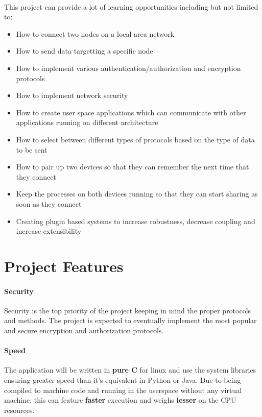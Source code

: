 \documentclass[12pt, letterpaper, titlepage]{article}
\begin{document}
    \paragraph{}
    This project can provide a lot of learning opportunities including but not
    limited to:
    \begin{itemize}
        \item{How to connect two nodes on a local area network}
        \item{How to send data targetting a specific node}
        \item{How to implement various authentication/authorization and
            encryption protocols}
        \item{How to implement network security}
        \item{How to create user space applications which can communicate with
            other applications running on different architecture}
        \item{How to select between different types of protocols based on the
            type of data to be sent}
        \item{How to pair up two devices so that they can remember the next
            time that they connect}
        \item{Keep the processes on both devices running so that they can start
            sharing as soon as they connect}
        \item{Creating plugin based systems to increase robustness, decrease
            coupling and increase extensibility}
    \end{itemize}


\newpage
\section{Project Features}

    \paragraph{Security}
    Security is the top priority of the project keeping in mind the proper
    protocols and methods. The project is expected to eventually implement the
    most popular and secure encryption and authorization protocols.

    \paragraph{Speed}
    The application will be written in \textbf{pure C} for linux and use the
    system libraries ensuring greater speed than it's equivalent in Python or
    Java.  Due to being compiled to machine code and running in the userspace
    without any virtual machine, this can feature \textbf{faster} execution and
    weighs \textbf{lesser} on the CPU resources.
\end{document}
